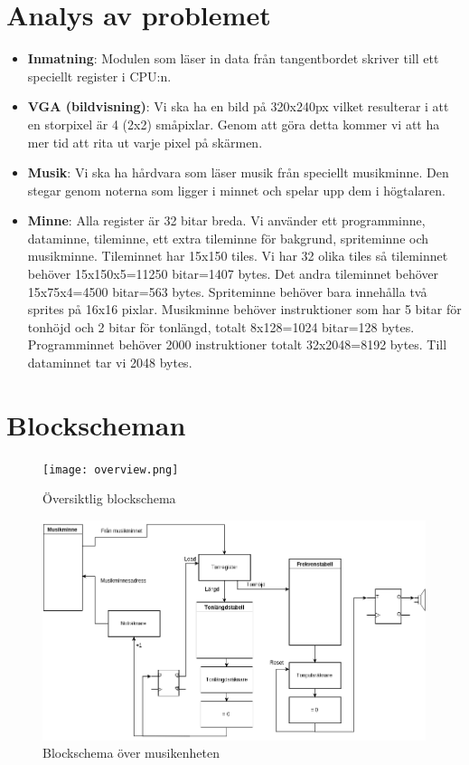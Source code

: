 \documentclass[a4paper,titlepage]{article}
\begin{document}
\section{Analys av problemet}
\begin{itemize}
	\item \textbf{Inmatning}: Modulen som läser in data från tangentbordet
		skriver till ett speciellt register i CPU:n.
	\item \textbf{VGA (bildvisning)}: Vi ska ha en bild på 320x240px vilket
		resulterar i att en storpixel är 4 (2x2) småpixlar. Genom att göra
		detta kommer vi att ha mer tid att rita ut varje pixel på skärmen. 
	\item \textbf{Musik}: Vi ska ha hårdvara som läser musik från speciellt
		musikminne. Den stegar genom noterna som ligger i minnet och spelar upp
		dem i högtalaren.
    \item \textbf{Minne}: Alla register är 32 bitar breda. Vi använder ett 
        programminne, dataminne, tileminne, ett extra tileminne för bakgrund,
        spriteminne och musikminne. Tileminnet har 15x150 tiles. Vi har 32
        olika tiles så tileminnet behöver 15x150x5=11250 bitar=1407 bytes. Det
        andra tileminnet behöver 15x75x4=4500 bitar=563 bytes. Spriteminne
        behöver bara innehålla två sprites på 16x16 pixlar. Musikminne behöver
        instruktioner som har 5 bitar för tonhöjd och 2 bitar för tonlängd,
        totalt 8x128=1024 bitar=128 bytes. Programminnet behöver 2000 
        instruktioner totalt 32x2048=8192 bytes. Till dataminnet tar vi 2048
        bytes.

\end{itemize}
\newpage
\section{Blockscheman}
\begin{figure}[h!]
	\centering
	\texttt{[image: overview.png]}
	\caption{Översiktlig blockschema}
\end{figure}

\begin{figure}[h!]
	\centering
\includegraphics[width=14cm]{Musik.png}
	\caption{Blockschema över musikenheten}
\end{figure}
\end{document}
